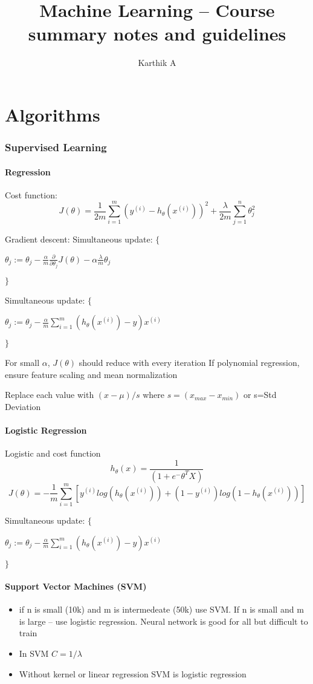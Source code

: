 \documentclass[12pt,a4paper]{article}
\author{Karthik A}
\title{Machine Learning -- Course summary notes and guidelines}
\begin{document}
\maketitle
\part{Algorithms}
\section{Supervised Learning}
\subsection{Regression}
Cost function:
$$J(\theta) = \frac{1}{2m}\sum_{i=1}^m(y^{(i)}-h_\theta(x^{(i)}))^2  + \frac {\lambda}{2m}\sum_{j=1}^{n}\theta_{j}^2$$

Gradient descent:
Simultaneous update: $\{$

$\theta_j := \theta_j - \frac {\alpha}{m}\frac {\partial }{\partial \theta_j}J(\theta) - \alpha \frac{\lambda}{m}\theta_j$

$\}$


Simultaneous update: $\{$

$\theta_j := \theta_j - \frac {\alpha}{m} \sum_{i=1}^{m} (h_\theta(x^{(i)})-y)x^{(i)}$

$\}$


For small $\alpha$, $J(\theta)$ should reduce with every iteration
If polynomial regression, ensure feature scaling and mean normalization

Replace each value with $(x-\mu)/s$ where $s=(x_{max}- x_{min})$ or s=Std Deviation

\subsection{Logistic Regression}

Logistic and cost function
$$h_\theta(x) = \frac{1}{(1+e^-\theta^T X)}$$
$$J(\theta) = -\frac{1}{m}\sum_{i=1}^{m}[y^{(i)}log(h_\theta(x^{(i)}))+(1-y^{(i)})log(1-h_\theta(x^{(i)}))]$$

Simultaneous update: $\{$

$\theta_j := \theta_j - \frac {\alpha}{m} \sum_{i=1}^{m} (h_\theta(x^{(i)})-y)x^{(i)}$

$\}$

\subsection{Support Vector Machines (SVM)}
\begin{itemize}
\item if n is small (10k) and m is intermedeate (50k) use SVM. If n is small and m is large -- use logistic regression. Neural network is good for all but difficult to train
\item In SVM $C=1/\lambda$
\item Without kernel or linear regression SVM is logistic regression
\end{itemize}
\end{document}
